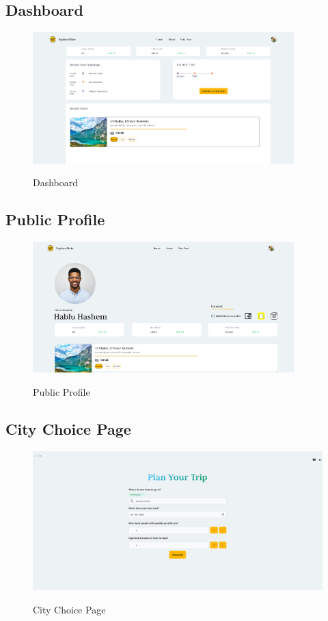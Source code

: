 \documentclass[12pt]{article}
\begin{document}
\subsection{Dashboard}
\begin{figure}[H]
    \centering
        \includegraphics[width=0.9\textwidth]{Mock UI/Dashboard.png}
        \label{fig:dashboard_ui}
    \caption{Dashboard}
\end{figure}

\subsection{Public Profile}
\begin{figure}[H]
    \centering
        \includegraphics[width=0.9\textwidth]{Mock UI/Public Profile.png}
        \label{fig:public_profile_ui}
    \caption{Public Profile}
\end{figure}

\newpage

\subsection{City Choice Page}
\begin{figure}[H]
    \centering
        \includegraphics[width=\textwidth]{Mock UI/City Choice.png}
        \label{fig:city_choice_ui}
    \caption{City Choice Page}
\end{figure}
\end{document}
